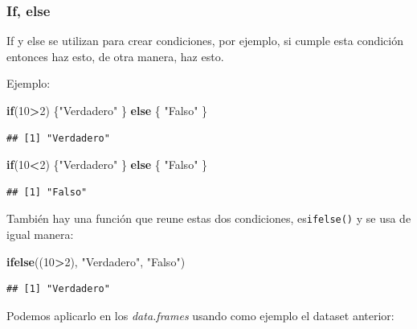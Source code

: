 \documentclass[
]{book}
\newenvironment{Shaded}{\begin{snugshade}}{\end{snugshade}}
\newcommand{\ControlFlowTok}[1]{\textcolor[rgb]{0.13,0.29,0.53}{\textbf{#1}}}
\newcommand{\DecValTok}[1]{\textcolor[rgb]{0.00,0.00,0.81}{#1}}
\newcommand{\FunctionTok}[1]{\textcolor[rgb]{0.13,0.29,0.53}{\textbf{#1}}}
\newcommand{\NormalTok}[1]{#1}
\newcommand{\SpecialCharTok}[1]{\textcolor[rgb]{0.81,0.36,0.00}{\textbf{#1}}}
\newcommand{\StringTok}[1]{\textcolor[rgb]{0.31,0.60,0.02}{#1}}
\begin{document}
\subsubsection{If, else}\label{if-else}

If y else se utilizan para crear condiciones, por ejemplo, si cumple esta condición entonces haz esto, de otra manera, haz esto.

Ejemplo:

\begin{Shaded}
\begin{Highlighting}[]
\ControlFlowTok{if}\NormalTok{(}\DecValTok{10}\SpecialCharTok{\textgreater{}}\DecValTok{2}\NormalTok{) \{}\StringTok{"Verdadero"}
\NormalTok{\} }\ControlFlowTok{else}\NormalTok{ \{}
  \StringTok{"Falso"}
\NormalTok{\}}
\end{Highlighting}
\end{Shaded}

\begin{verbatim}
## [1] "Verdadero"
\end{verbatim}

\begin{Shaded}
\begin{Highlighting}[]
\ControlFlowTok{if}\NormalTok{(}\DecValTok{10}\SpecialCharTok{\textless{}}\DecValTok{2}\NormalTok{) \{}\StringTok{"Verdadero"}
\NormalTok{\} }\ControlFlowTok{else}\NormalTok{ \{}
  \StringTok{"Falso"}
\NormalTok{\}}
\end{Highlighting}
\end{Shaded}

\begin{verbatim}
## [1] "Falso"
\end{verbatim}

También hay una función que reune estas dos condiciones, es\texttt{ifelse()} y se usa de igual manera:

\begin{Shaded}
\begin{Highlighting}[]
\FunctionTok{ifelse}\NormalTok{((}\DecValTok{10}\SpecialCharTok{\textgreater{}}\DecValTok{2}\NormalTok{), }\StringTok{"Verdadero"}\NormalTok{, }\StringTok{"Falso"}\NormalTok{)}
\end{Highlighting}
\end{Shaded}

\begin{verbatim}
## [1] "Verdadero"
\end{verbatim}

Podemos aplicarlo en los \emph{data.frames} usando como ejemplo el dataset anterior:
\end{document}

